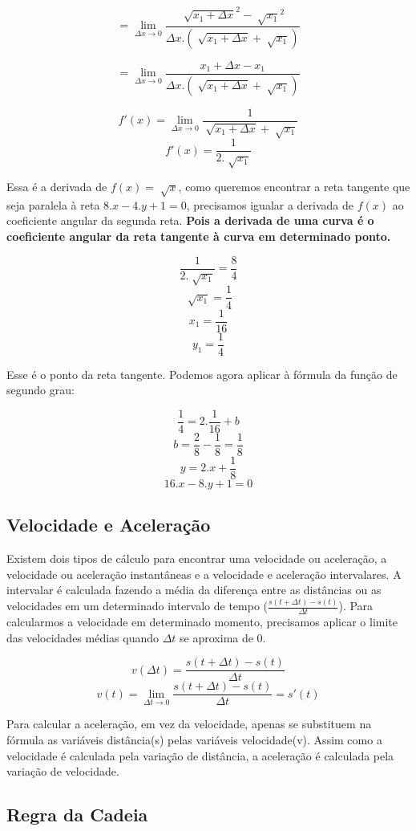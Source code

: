 \documentclass[ ]{article}
\begin{document}
		$$= \lim_{\Delta x \to 0}\dfrac{\sqrt[ ]{x_1+\Delta x}^2-\sqrt[ ]{x_1}^2}  {\Delta x.(\sqrt[ ]{x_1 + \Delta x}+ \sqrt[ ]{x_1})}$$		
		
		$$= \lim_{\Delta x \to 0}\dfrac{x_1+\Delta x-x_1}{\Delta x.(\sqrt[ ]{x_1 + \Delta x}+ \sqrt[ ]{x_1})}$$
		
		$$f'(x) = \lim_{\Delta x\to 0}\dfrac{1}{\sqrt[ ]{x_1+\Delta x}+ \sqrt[ ]{x_1}}$$
		$$f'(x) = \dfrac{1}{2.\sqrt[ ]{x_1}}$$
		
		Essa é a derivada de $f(x) = \sqrt[ ]{x}$, como queremos encontrar a reta tangente que seja paralela à reta $8.x-4.y+1=0$, precisamos igualar a derivada de $f(x)$ ao coeficiente angular da segunda reta. \textbf{Pois a derivada de uma curva é o coeficiente angular da reta tangente à curva em determinado ponto.}
		
		$$\dfrac{1}{2.\sqrt[ ]{x_1}}=\dfrac{8}{4}$$
		$$\sqrt[ ]{x_1}=\dfrac{1}{4}$$
		$$x_1 = \dfrac{1}{16}$$
		$$y_1 = \dfrac{1}{4}$$

		Esse é o ponto da reta tangente. Podemos agora aplicar à fórmula da função de segundo grau:

		$$\dfrac{1}{4}=2.\dfrac{1}{16}+b$$
		$$b =\dfrac{2}{8}-\dfrac{1}{8}=\dfrac{1}{8}$$
		$$y=2.x+\dfrac{1}{8}$$
		$$16.x-8.y+1=0$$
		
	\subsection{Velocidade e Aceleração}
		Existem dois tipos de cálculo para encontrar uma velocidade ou aceleração, a velocidade ou aceleração instantâneas e a velocidade e aceleração intervalares. A intervalar é calculada fazendo a média da diferença entre as distâncias ou as velocidades em um determinado intervalo de tempo ($\frac{s(t+\Delta t)-s(t)}{\Delta t}$). Para calcularmos a velocidade em determinado momento, precisamos aplicar o limite das velocidades médias quando $\Delta t$ se aproxima de 0.
		
		$$v(\Delta t) = \frac{s(t+\Delta t)-s(t)}{\Delta t}$$
		$$v(t) =\lim_{\Delta t\to 0}\frac{s(t+\Delta t)-s(t)}{\Delta t}= s'(t)$$
		
		Para calcular a aceleração, em vez da velocidade, apenas se substituem na fórmula as variáveis distância(s) pelas variáveis velocidade(v). Assim como a velocidade é calculada pela variação de distância, a aceleração é calculada pela variação de velocidade.
		
	\subsection{Regra da Cadeia}
\end{document}
